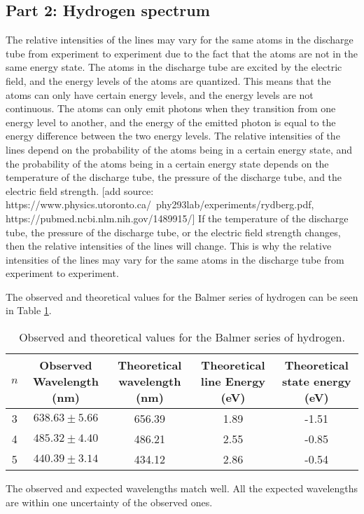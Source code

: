 
\subsection{Part 2: Hydrogen spectrum}



The relative intensities of the lines may vary for the same atoms in the discharge tube from experiment to experiment due to the fact that the atoms are not in the same energy state.
The atoms in the discharge tube are excited by the electric field, and the energy levels of the atoms are quantized.
This means that the atoms can only have certain energy levels, and the energy levels are not continuous.
The atoms can only emit photons when they transition from one energy level to another, and the energy of the emitted photon is equal to the energy difference between the two energy levels.
The relative intensities of the lines depend on the probability of the atoms being in a certain energy state, and the probability of the atoms being in a certain energy state depends on the temperature of the discharge tube,
the pressure of the discharge tube, and the electric field strength. [add source: https://www.physics.utoronto.ca/~phy293lab/experiments/rydberg.pdf, https://pubmed.ncbi.nlm.nih.gov/1489915/] If the temperature of the discharge tube, the pressure of the discharge tube, or the electric field strength changes, then the relative intensities of the lines will change.
This is why the relative intensities of the lines may vary for the same atoms in the discharge tube from experiment to experiment.

The observed and theoretical values for the Balmer series of hydrogen can be seen in Table \ref{tab:my_label}.

\begin{table}[h]
    \centering
    \begin{adjustbox}{width=1.5\textwidth, center}
        \begin{tabular}{|c|c|c|c|c|}
            \hline
            $n$ & Observed Wavelength (nm) & Theoretical wavelength (nm) & Theoretical line Energy (eV) & Theoretical state energy (eV) \\
            \hline
            3   & $638.63 \pm 5.66$        & 656.39                      & 1.89                         & -1.51                         \\
            4   & $485.32 \pm 4.40$        & 486.21                      & 2.55                         & -0.85                         \\
            5   & $440.39 \pm 3.14$        & 434.12                      & 2.86                         & -0.54                         \\
            \hline
        \end{tabular}
    \end{adjustbox}
    \caption{Observed and theoretical values for the Balmer series of hydrogen.}
    \label{tab:my_label}
\end{table}


The observed and expected wavelengths match well. All the expected wavelengths are within one uncertainty of the observed ones.